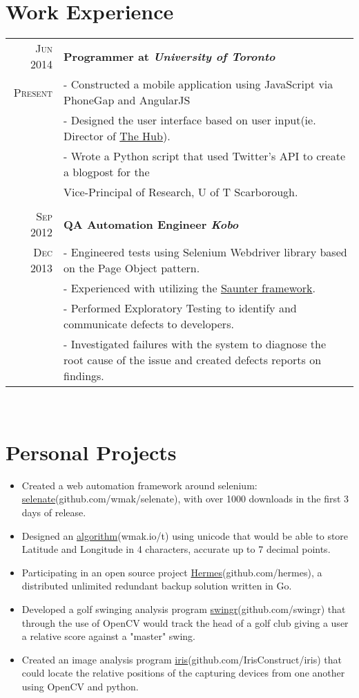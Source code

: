 \documentclass[a4paper, 11pt]{article}
\begin{document}
\section{Work Experience}
\begin{tabular}{r|p{16cm}}
	\textsc{Jun 2014}
	&	\bf{Programmer at \emph{University of Toronto}}\\
	\textsc{Present}
	& - Constructed a mobile application using JavaScript via PhoneGap and AngularJS\\
	& - Designed the user interface based on user input(ie. Director of \href{http://blog.utsc.ut    oronto.ca/thehub/}{The Hub}).\\
	& - Wrote a Python script that used Twitter's API to create a blogpost for
	the\\&	Vice-Principal of Research, U of T Scarborough.\\
	\\
	\textsc{Sep 2012}
	&	\bf{QA Automation Engineer \emph{Kobo}}\\
	\textsc{Dec 2013}
	& - Engineered tests using Selenium Webdriver library based on the Page Object pattern.\\
 & - Experienced with utilizing the \href{https://github.com/Element-34/py.saunter}{Saunter framework}.\\
 & - Performed Exploratory Testing to identify and communicate defects to developers.\\
 & - Investigated failures with the system to diagnose the root cause of the issue and created defects reports on findings.\\
\end{tabular}\\

\section{\bf{Personal Projects}}
\begin{itemize}
	\setlength\itemsep{0.1em}
	\item Created a web automation framework around selenium:
		\href{https://github.com/wmak/selenate}{selenate}(github.com/wmak/selenate),
		with over 1000 downloads in the first 3 days of release.
	\item Designed an \href{http://wmak.io/t.html}{algorithm}(wmak.io/t) using
		unicode that would be able to store Latitude and Longitude in 4
		characters, accurate up to 7 decimal points.  
	\item Participating in an open source project
		\href{https://github.com/hermes/hermes}{Hermes}(github.com/hermes), a
		distributed unlimited redundant backup solution written in Go.  
	\item Developed a golf swinging analysis program
		\href{http://github.com/swingr/}{swingr}(github.com/swingr) that through
		the use of OpenCV would track the head of a golf club giving a user a
		relative score against a "master" swing.
	\item Created an image analysis program
		\href{https://github.com/IrisConstruct/iris}{iris}(github.com/IrisConstruct/iris)
		that could locate the relative positions of the capturing devices from
		one another using OpenCV and python.
\end{itemize}
\end{document}
